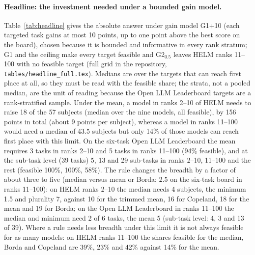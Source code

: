 \documentclass{article}
\begin{document}
\paragraph{Headline: the investment needed under a bounded gain model.}
Table~\ref{tab:headline} gives the absolute answer under gain model G1+10 (each targeted task gains at most 10 points, up to one point above the best score on the board), chosen because it is bounded and informative in every rank stratum; G1 and the ceiling make every target feasible and G2$_{0.5}$ leaves HELM ranks 11--100 with no feasible target (full grid in the repository, \texttt{tables/headline\_full.tex}). Medians are over the targets that can reach first place at all, so they must be read with the feasible share; the strata, not a pooled median, are the unit of reading because the Open LLM Leaderboard targets are a rank-stratified sample.
Under the mean, a model in ranks 2--10 of HELM needs to raise 18 of the 57 subjects (median over the nine models, all feasible), by 156 points in total (about 9 points per subject), whereas a model in ranks 11--100 would need a median of 43.5 subjects but only 14\% of those models can reach first place with this limit. On the six-task Open LLM Leaderboard the mean requires 3 tasks in ranks 2--10 and 5 tasks in ranks 11--100 (94\% feasible), and at the sub-task level (39 tasks) 5, 13 and 29 sub-tasks in ranks 2--10, 11--100 and the rest (feasible 100\%, 100\%, 58\%).
The rule changes the breadth by a factor of about three to five (median versus mean or Borda; 2.5 on the six-task board in ranks 11--100): on HELM ranks 2--10 the median needs 4 subjects, the minimum 1.5 and plurality 7, against 10 for the trimmed mean, 16 for Copeland, 18 for the mean and 19 for Borda; on the Open LLM Leaderboard in ranks 11--100 the median and minimum need 2 of 6 tasks, the mean 5 (sub-task level: 4, 3 and 13 of 39). Where a rule needs less breadth under this limit it is not always feasible for as many models: on HELM ranks 11--100 the shares feasible for the median, Borda and Copeland are 39\%, 23\% and 42\% against 14\% for the mean.
\begin{table}[t]
\caption{Absolute investment under G1+10 by rank under the mean: median $k_{\min}$ [95\% bootstrap CI over feasible targets, shown where $\ge10$ are feasible; parentheses: fewer than 5 feasible targets], median $G_{\min}$ in points over the feasible targets, an infimum with strictness ignored (``--'': not computed for every feasible target, as for the ordinal rules and the trimmed mean off G1 and the median at six tasks) and the share of targets that can reach first place. The Open LLM Leaderboard headline targets are a rank-stratified sample.}\label{tab:headline}
\centering\tiny\resizebox{\linewidth}{!}{}
\end{table}
\end{document}
